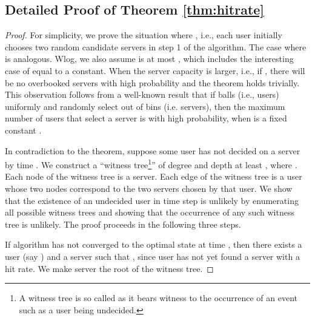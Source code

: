 \documentclass[conference]{IEEEtran}
\newcommand{\comment}[1]{}
\begin{document}


\balance
\newpage
\appendix

\subsection{Detailed Proof of Theorem \ref{thm:hitrate}}
\begin{proof}
For simplicity, we prove the situation where , i.e., each user initially chooses two random candidate servers in step 1 of the algorithm. The case where  is analogous. 
\comment{Further we will assume that a user  requesting application from an overbooked server   at time ,  , has ,  as the probability that this assumption is violated at most  as per Lemma~\ref{lem:overbookhit}.}  Wlog, we also assume   is at most , which includes the interesting case of   equal to a constant.  When the server capacity is larger, i.e., if  ,  there will be no overbooked servers with high probability and the theorem holds trivially. This observation follows from a well-known result that if  balls (i.e., users)  uniformly and randomly select   out of  bins (i.e. servers), then the maximum number of users that select a server is  with high probability, when   is a fixed constant \cite{raab1998balls}. 

In contradiction to the theorem, suppose some user  has not decided on a server  by time . We construct a ``witness tree\footnote{A witness tree is so called as it bears witness to the occurrence of an event such as  a user being undecided.}''  of degree  and depth at least , where  . Each node of the witness tree is a server. Each edge of the witness tree is a user whose two nodes correspond to the two servers chosen by that user.  We show that the existence of an undecided user in time step  is unlikely by enumerating all possible witness trees and showing that the occurrence of any such  witness tree is unlikely.  The proof proceeds in the following three steps.

  If algorithm  has not converged to the optimal state at time , then there exists a user (say )  and a server  such that , since user  has not yet found a server with a  hit rate. We make server  the root of the witness tree.



\end{proof}
\end{document}
